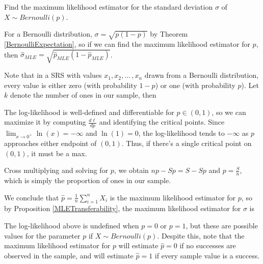 \begin{examp}Find the maximum likelihood estimator for the standard deviation $\sigma$ of $X \sim Bernoulli(p)$.
\par
\noindent For a Bernoulli distribution, $\sigma = \sqrt{p(1-p)}$ by Theorem \ref{BernoulliExpectation}, so if we can find the maximum likelihood estimator for $p$, then $\widehat{\sigma}_{MLE} = \sqrt{\widehat{p}_{MLE}(1-\widehat{p}_{MLE})}$. 
\par
\noindent Note that in a SRS with values $x_1, x_2, \dots\,,x_n$ drawn from a Bernoulli distribution, every value is either zero (with probability $1-p$) or one (with probability $p$). Let $k$ denote the number of ones in our sample, then
\par
\noindent The log-likelihood is well-defined and differentiable for $p \in (0,1)$, so we can maximize it by computing $\frac{d\ell}{dp}$ and identifying the critical points. Since $\lim_{x \to 0^{+}} \ln(x) = -\infty$ and $\ln(1) = 0$, the log-likelihood tends to $-\infty$ as $p$ approaches either endpoint of $(0,1)$. Thus, if there's a single critical point on $(0,1)$, it must be a max.
\par
\noindent Cross multiplying and solving for $p$, we obtain $np - Sp = S-Sp$ and $p = \frac{S}{n}$, which is simply the proportion of ones in our sample.
\par
\noindent We conclude that $\widehat{p} = \frac{1}{n}\sum_{i=1}^{n}X_i$ is the maximum likelihood estimator for $p$, so by Proposition \ref{MLETransferability}, the maximum likelihood estimator for $\sigma$ is
\end{examp}
\par
\noindent\rmk The log-likelihood above is undefined when $p = 0$ or $p=1$, but these are possible values for the parameter $p$ if $X \sim Bernoulli(p)$. Despite this, note that the maximum likelihood estimator for $p$ will estimate $\widehat{p} = 0$ if no successes are observed in the sample, and will estimate $\widehat{p} = 1$ if every sample value is a success.


